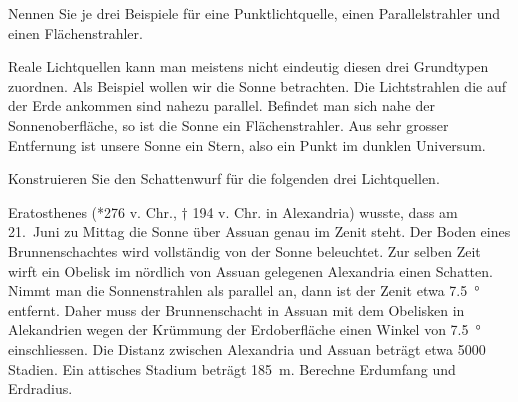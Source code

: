 \documentclass[paper=a4,twoside=true,,DIV13,BCOR1cm]{scrartcl}
\begin{document}
\begin{aufgabe}
	Nennen Sie je drei Beispiele für eine Punktlichtquelle, einen Parallelstrahler und einen Flächenstrahler.
\end{aufgabe}

\vspace*{3cm}

Reale Lichtquellen kann man meistens nicht eindeutig diesen drei Grundtypen zuordnen. Als Beispiel wollen wir die
Sonne betrachten. Die Lichtstrahlen die auf der Erde ankommen sind nahezu parallel. Befindet man sich nahe der
Sonnenoberfläche, so ist die Sonne ein Flächenstrahler. Aus sehr grosser Entfernung ist unsere Sonne ein Stern,
also ein Punkt im dunklen Universum.

\begin{aufgabe}
Konstruieren Sie den Schattenwurf für die folgenden drei Lichtquellen.	



\end{aufgabe}

\begin{aufgabe}
Eratosthenes (*276 v. Chr., $\dagger$ 194 v. Chr. in Alexandria) wusste, dass
	am 21.\ Juni zu Mittag die Sonne über Assuan genau im Zenit steht.
	Der Boden eines Brunnenschachtes wird vollständig von der Sonne beleuchtet. 
 Zur selben Zeit wirft ein Obelisk im nördlich von Assuan gelegenen Alexandria einen Schatten.
 Nimmt man die Sonnenstrahlen als parallel an, dann ist der Zenit etwa \SI{7.5}{\degree} entfernt.
 Daher muss der Brunnenschacht in Assuan mit dem Obelisken in Alekandrien wegen der
 Krümmung der Erdoberfläche einen Winkel von \SI{7.5}{\degree} einschliessen.
 Die Distanz zwischen Alexandria und Assuan beträgt etwa 5000 Stadien. Ein
 attisches Stadium beträgt \SI{185}{m}. Berechne Erdumfang und Erdradius.
\end{aufgabe}
\end{document}
